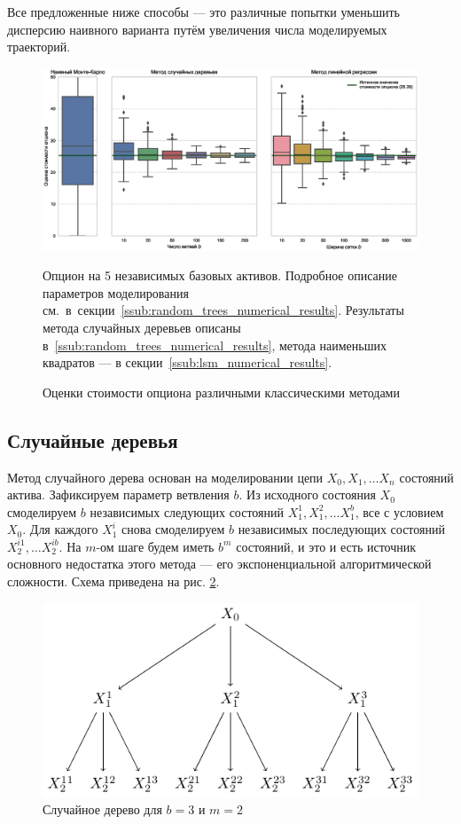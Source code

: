 \documentclass[specialist,
               substylefile = ../spbu.rtx,
               subf,href,colorlinks=true, 12pt]{disser}
\begin{document}
Все предложенные ниже способы --- это различные попытки уменьшить дисперсию наивного варианта путём увеличения числа моделируемых траекторий. 

\begin{figure}[t]
    \centering
	\includegraphics[width=\textwidth]{classical_methods.eps}
	\caption{Оценки стоимости опциона различными классическими методами}
	\footnotesize Опцион на 5 независимых базовых активов. Подробное описание параметров моделирования см.~в~секции~\ref{ssub:random_trees_numerical_results}. Результаты метода случайных деревьев описаны в~\ref{ssub:random_trees_numerical_results}, метода наименьших квадратов --- в секции~\ref{ssub:lsm_numerical_results}.
	\label{fig:classical_methods}
\end{figure}

\subsection{Случайные деревья} %
\label{sub:tree_estimator}

Метод случайного дерева основан на моделировании цепи $X_0, X_1, \ldots X_n$ состояний актива. Зафиксируем параметр ветвления $b$. Из исходного состояния $X_0$ смоделируем $b$ независимых следующих состояний $X_1^1, X_1^2, \ldots X_1^b$, все с условием $X_0$. Для каждого $X_1^i$ снова смоделируем $b$ независимых последующих состояний $X_2^{i1}, \ldots X_2^{ib}$. На $m$-ом шаге будем иметь $b^m$ состояний, и это и есть источник основного недостатка этого метода --- его экспоненциальной алгоритмической сложности. Схема приведена на рис. \ref{fig:exponential_tree}.
\begin{figure}[b]
    \centering
	\includegraphics{exponential_tree.pdf}
	\caption{Случайное дерево для $b = 3$ и $m = 2$}
	\label{fig:exponential_tree}
\end{figure}
\end{document}
